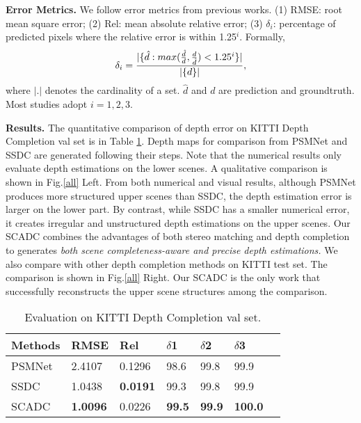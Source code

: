 \documentclass{article}
\begin{document}
\textbf{Error Metrics.} We follow error metrics from previous works. (1) RMSE: root mean square error; (2) Rel: mean absolute relative error; (3) $\delta_i$: percentage of predicted pixels where the relative error is within 1.25$^i$. Formally,
\begin{equation}
    \vspace{-7pt}
     \delta_i = \frac{|\{\hat{d}:max(\frac{\hat{d}}{d},\frac{d}{\hat{d}})<1.25^i \}|} {|\{d\}|},
     \label{delat}
\end{equation}
where $|.|$ denotes the cardinality of a set. $\hat{d}$ and $d$ are prediction and groundtruth. Most studies adopt $i=1,2,3$.

\textbf{Results.} The quantitative comparison of depth error on KITTI Depth Completion val set is in Table \ref{table:input_comp}. Depth maps for comparison from PSMNet \cite{chang2018pyramid} and SSDC \cite{ma2019self} are generated following their steps. Note that the numerical results only evaluate depth estimations on the lower scenes. A qualitative comparison is shown in Fig.\ref{all} Left. From both numerical and visual results, although PSMNet produces more structured upper scenes than SSDC, the depth estimation error is larger on the lower part. By contrast, while SSDC has a smaller numerical error, it creates irregular and unstructured depth estimations on the upper scenes. Our SCADC combines the advantages of both stereo matching and depth completion to generates \textit{both scene completeness-aware and precise depth estimations.} We also compare with other depth completion methods on KITTI test set. The comparison is shown in Fig.\ref{all} Right. Our SCADC is the only work that successfully reconstructs the upper scene structures among the comparison.

\begin{table}[bt!]
\begin{center}
\caption{Evaluation on KITTI Depth Completion val set.}
\label{table:input_comp}
\footnotesize
\begin{tabular}{|p{1.2cm}<{\centering}||p{0.9cm}<{\centering}|p{0.9cm}<{\centering}|p{0.9cm}<{\centering}|p{0.5cm}<{\centering}|p{0.5cm}<{\centering}|p{0.5cm}<{\centering}|}
\hline
Methods & RMSE &Rel & $\delta$1 & $\delta$2 & $\delta$3\\
\hline
PSMNet & 2.4107 & 0.1296 & 98.6 & 99.8 & 99.9\\
SSDC  & 1.0438 & \textbf{0.0191} & 99.3 & 99.8 & 99.9\\
SCADC  & \textbf{1.0096} & 0.0226 & \textbf{99.5} & \textbf{99.9} & \textbf{100.0}\\
\hline
\end{tabular}
\end{center}
\vspace{-25pt}
\end{table}
\end{document}

